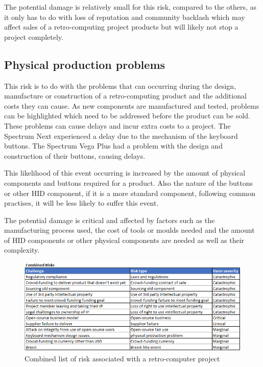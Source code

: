 The potential damage is relatively small for this risk, compared to the others, as it only has to do with loss of reputation and community backlash which may affect sales of a retro-computing project products but will likely not stop a project completely.  \\

\subsection{Physical production problems}
This risk is to do with the problems that can occurring during the design, manufacture or construction of a retro-computing product and the additional costs they can cause. As new components are manufactured and tested, problems can be highlighted which need to be addressed before the product can be sold. These problems can cause delays and incur extra costs to a project. The Spectrum Next experienced a delay due to the mechanism of the keyboard buttons. The Spectrum Vega Plus had a problem with the design and construction of their buttons, causing delays. 

This likelihood of this event occurring is increased by the amount of physical components and buttons required for a product. Also the nature of the buttons or other HID component, if it is a more standard component, following common practises, it will be less likely to suffer this event.

The potential damage is critical and affected by factors such as the manufacturing process used, the cost of tools or moulds needed and the amount of HID components or other physical components are needed as well as their complexity.\\ 

\begin{figure} \begin{center}
\includegraphics[width= 1\linewidth]{pics/risk_list} 
\end{center} 
\caption{Combined list of risk associated with a retro-computer project}
\label{case_study_process}
\end{figure} 
